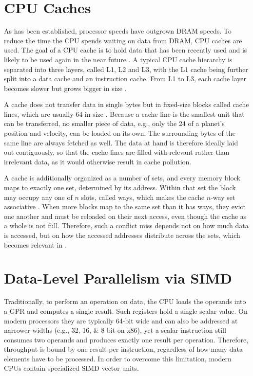 \section{CPU Caches}
\label{sec:background:cache}
As has been established, processor speeds have outgrown DRAM speeds. To reduce the time the CPU spends waiting on data from DRAM, CPU caches are used. The goal of a CPU cache is to hold data that has been recently used and is likely to be used again in the near future \cite{hill1987aspects}. A typical CPU cache hierarchy is separated into three layers, called L1, L2 and L3, with the L1 cache being further split into a data cache and an instruction cache. From L1 to L3, each cache layer becomes slower but grows bigger in size \cite{drepper2007every}.

A cache does not transfer data in single bytes but in fixed-size blocks called cache lines, which are usually \qty{64}{\byte} in size \cite{drepper2007every}. Because a cache line is the smallest unit that can be transferred, no smaller piece of data, e.g., only the \qty{24}{\byte} of a planet's position and velocity, can be loaded on its own. The surrounding bytes of the same line are always fetched as well. The data at hand is therefore ideally laid out contiguously, so that the cache lines are filled with relevant rather than irrelevant data, as it would otherwise result in cache pollution.

A cache is additionally organized as a number of sets, and every memory block maps to exactly one set, determined by its address. Within that set the block may occupy any one of $n$ slots, called ways, which makes the cache $n$-way set associative \cite{hennessy2011computer}. When more blocks map to the same set than it has ways, they evict one another and must be reloaded on their next access, even though the cache as a whole is not full. Therefore, such a conflict miss \cite{hill1987aspects} depends not on how much data is accessed, but on how the accessed addresses distribute across the sets, which becomes relevant in .

\section{Data-Level Parallelism via SIMD}
\label{sec:background:simd}
Traditionally, to perform an operation on data, the CPU loads the operands into a \ac{GPR} and computes a single result. Such registers hold a single scalar value. On modern processors they are typically \num{64}-bit wide and can also be addressed at narrower widths (e.g., \numlist{32;16;8}-bit on x86), yet a scalar instruction still consumes two operands and produces exactly one result per operation. Therefore, throughput is bound by one result per instruction, regardless of how many data elements have to be processed. In order to overcome this limitation, modern CPUs contain specialized \ac{SIMD} vector units.

